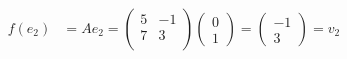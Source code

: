 \documentclass[a4paper]{scrartcl}
\begin{document}
\begin{enumerate}[label=\bfseries\arabic*.]
\begin{enumerate}
\begin{align}
                    \begin{split}
                        f(e_2) &= Ae_2 =
                        \begin{pmatrix}
                            5 & -1 \\
                            7 &  3 \\
                        \end{pmatrix}
                        \begin{pmatrix}
                            0 \\ 1
                        \end{pmatrix}
                        =
                        \begin{pmatrix}
                            -1 \\ 3
                        \end{pmatrix}
                        = v_2
                    \end{split}
                \end{align}
                

\end{enumerate}
\end{enumerate}
\end{document}
